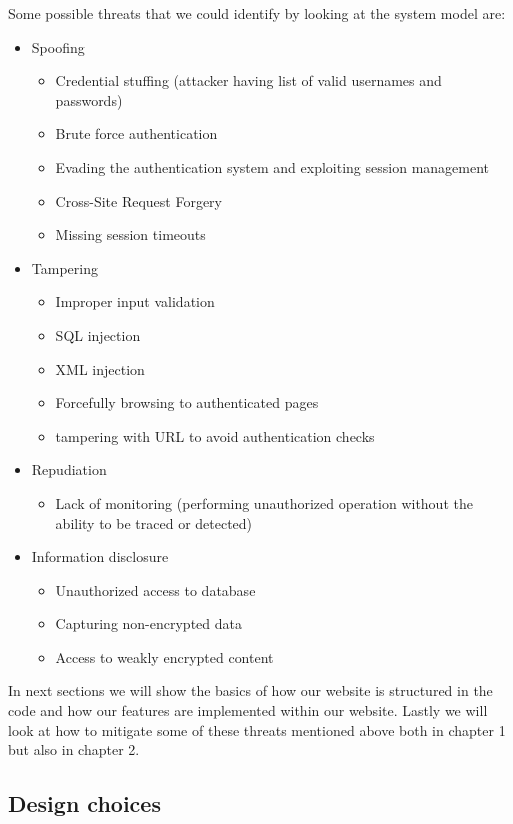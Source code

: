 Some possible threats that we could identify by looking at the system model are:
\begin{itemize}
   \item Spoofing
   \begin{itemize}
      \item Credential stuffing (attacker having list of valid usernames and passwords)
      \item Brute force authentication
      \item Evading the authentication system and exploiting session management
      \item Cross-Site Request Forgery
      \item Missing session timeouts 
  \end{itemize}
  \item Tampering
  \begin{itemize}
     \item Improper input validation
     \item SQL injection
     \item XML injection
     \item Forcefully browsing to authenticated pages 
     \item tampering with URL to avoid authentication checks
   \end{itemize}
   \item Repudiation
   \begin{itemize}
    \item  Lack of monitoring (performing unauthorized operation without the ability to be traced or detected)
   \end{itemize}
   \item Information disclosure
   \begin{itemize}
     \item Unauthorized access to database
     \item Capturing non-encrypted data
     \item Access to weakly encrypted content
   \end{itemize}
\end{itemize}

In next sections we will show the basics of how our website is structured in the code and how our features are implemented within our website. Lastly we will look at how to mitigate some of these threats mentioned above both in chapter 1 but also in chapter 2. %

\subsection{Design choices}

